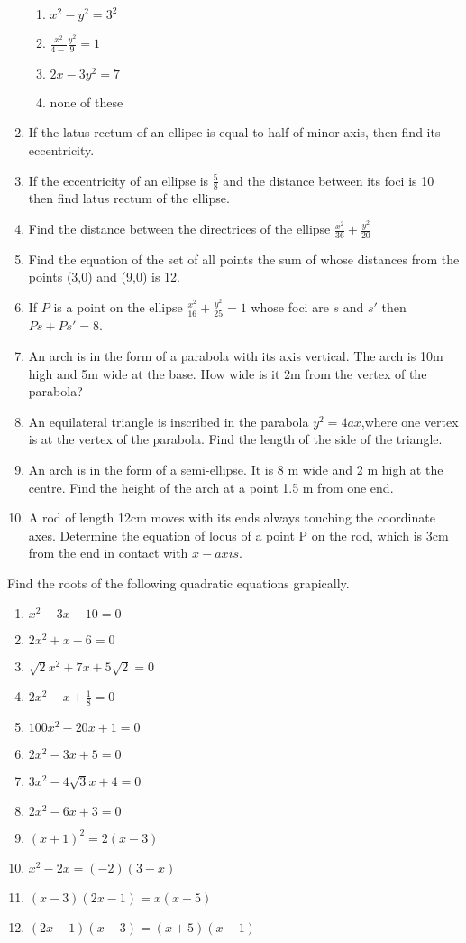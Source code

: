 \begin{enumerate}[label=\thesubsection.\arabic*,ref=\thesubsection.\theenumi]
\begin{enumerate}
\item $x^2-y^2=3^2$
\item $\frac{x^2}{4-}\frac{y^2}{9}=1$
\item $2x-3y^2=7$
 \item none of these
 \end{enumerate}
 \item If the latus rectum of an ellipse is equal to half of minor axis, then find its eccentricity.
 \item If the eccentricity of an ellipse is $\frac{5}{8}$ and  the distance between its foci is 10 then find latus rectum of the ellipse.
 \item Find the distance between the directrices of the ellipse $\frac{x^2}{36}+\frac{y^2}{20}$
\item Find the equation of the set of all points the sum of whose distances  from the points (3,0) and (9,0) is 12.
\item If ${P}$ is a point on the ellipse $\frac{x^2}{16}+\frac{y^2}{25}=1$ whose foci  are $s$ and $s'$ then $Ps +Ps'=8$.
\item An arch is in the form of a parabola with its axis vertical. The arch is 10m high and 5m wide at the base. How wide is it 2m from the vertex of the parabola?
\label{chapters/11/11/5/2}
\item An equilateral triangle is inscribed in the parabola $y^{2} = 4ax$,where one vertex is at the vertex of the parabola. Find the length of the side of the triangle.
\label{chapters/11/11/5/8}
\item An arch is in the form of a semi-ellipse. It is 8 m wide and 2 m high at the centre. Find the height of the arch at a point 1.5 m from one end.
\label{chapters/11/11/5/4}
\item A rod of length 12cm moves with its ends always touching the coordinate axes. Determine the equation of locus of a point  P on the rod, which is 3cm from the end in contact with $x-axis$.
\label{chapters/11/11/5/5}
\end{enumerate}
Find the roots of the following quadratic  equations grapically.
\begin{enumerate}[label=\thesubsection.\arabic*,ref=\thesubsection.\theenumi,resume*]
\item $x^2-3x-10=0$
\item $2x^2+x-6=0$
\item $ \sqrt 2x^2+7x+5 \sqrt 2=0$
\item $2x^2-x+\frac{1}{8}=0$
\item $100x^2-20x+1=0$
\item $2x^2-3x+5=0$
\item $3x^2-4 \sqrt 3x+4=0$
\item $2x^2-6x+3=0$
\item $(x+1)^2=2(x-3)$
\item $x^2-2x=(-2)(3-x)$
\item $(x-3)(2x-1)=x(x+5)$
\item $(2x-1)(x-3)=(x+5)(x-1)$
\end{enumerate}
